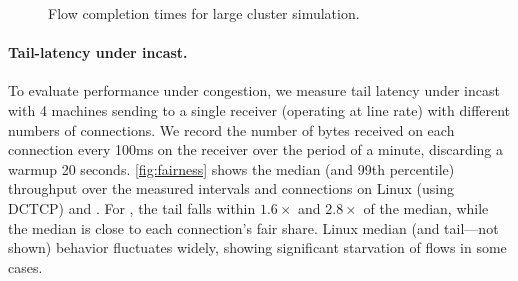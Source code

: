\begin{figure}
  \vspace{-1.8ex}
  \centering
  \hspace*{-0.25cm}
  \caption{Flow completion times for large cluster simulation.}
  \label{fig:ns3-cluster}
\end{figure}

%

\paragraph{Tail-latency under incast.} To evaluate performance under
congestion, we measure tail latency under incast with 4 machines
sending to a single receiver (operating at line rate) with different
numbers of connections.  We record the number of bytes received on
each connection every 100ms on the receiver over the period of a
minute, discarding a warmup 20 seconds.  \autoref{fig:fairness} shows
the median (and 99th percentile) throughput over the measured
intervals and connections on Linux (using DCTCP) and \rmttcp.  For
\rmttcp, the tail falls within $1.6\times$ and $2.8\times$ of the
median, while the median is close to each connection's fair
share. Linux median (and tail---not shown) behavior fluctuates
widely, showing significant starvation of flows in some cases.

